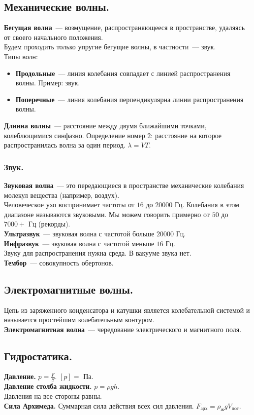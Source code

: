 \documentclass{article}
\begin{document}
	\subsection{Механические волны.}
	\textbf{Бегущая волна}~--- возмущение, распространяющееся в пространстве, удаляясь от своего начального положения. \\
	Будем проходить только упругие бегущие волны, в частности~--- звук. \\
	Типы волн:
	\begin{itemize}
		\item \textbf{Продольные}~--- линия колебания совпадает с линией распространения волны. Пример: звук.
		\item \textbf{Поперечные}~--- линия колебания перпендикулярна линии распространения волны.
	\end{itemize}
	\textbf{Длинна волны}~--- расстояние между двумя ближайшими точками, колеблющимися синфазно. Определение номер $2$: расстояние на которое распространилась волна за один период. $\lambda = VT$.
	\subsubsection{Звук.}
	\textbf{Звуковая волна}~--- это передающиеся в пространстве механические колебания молекул вещества (например, воздух). \\
	Человеческое ухо воспринимает частоты от $16$ до $20000$ Гц. Колебания в этом диапазоне называются звуковыми. Мы можем говорить примерно от $50$ до $7000+$ Гц (рекорды). \\
	\textbf{Ультразвук}~--- звуковая волна с частотой больше $20000$ Гц. \\
	\textbf{Инфразвук}~--- звуковая волна с частотой меньше $16$ Гц. \\
	Звуку для распространения нужна среда. В вакууме звука нет. \\
	\textbf{Тембор}~--- совокупность обертонов.
	\subsection{Электромагнитные волны.}
	Цепь из заряженного конденсатора и катушки является колебательной системой и называется простейшим колебательным контуром. \\
	\textbf{Электромагнитная волна}~--- чередование электрического и магнитного поля.
	\subsection{Гидростатика.}
	\textbf{Давление.} $p = \frac{F}{S}$. $\left[p\right] =$ Па. \\
	\textbf{Давление столба жидкости.} $p = \rho g h$. \\
	Давления на все стороны равны. \\
	\textbf{Сила Архимеда.} Суммарная сила действия всех сил давления. $F_{\text{арх}} = \rho_{\text{ж}} g V_{\text{пог}}$.
\end{document}
